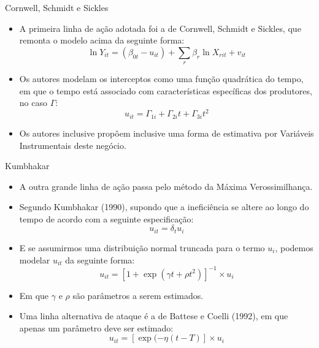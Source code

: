 \documentclass{beamer}
\begin{document}
\begin{frame}{Cornwell, Schmidt e Sickles}

\begin{itemize}
\item A primeira linha de ação adotada foi a de Cornwell, Schmidt e Sickles,
que remonta o modelo acima da seguinte forma:
\[
\ln Y_{it}=(\beta_{0t}-u_{it})+\sum_{r}\beta_{r}\ln X_{rit}+v_{it}
\]
\item Os autores modelam os interceptos como uma função quadrática do tempo,
em que o tempo está associado com características específicas dos
produtores, no caso $\Gamma$:
\[
u_{it}=\Gamma_{1i}+\Gamma_{2i}t+\Gamma_{3i}t^{2}
\]
\item Os autores inclusive propôem inclusive uma forma de estimativa por
Variáveis Instrumentais deste negócio.
\end{itemize}
\end{frame}

\begin{frame}{Kumbhakar}

\begin{itemize}
\item A outra grande linha de ação passa pelo método da Máxima Verossimilhança. 
\item Segundo Kumbhakar (1990), supondo que a ineficiência se altere ao
longo do tempo de acordo com a seguinte especificação:
\[
u_{it}=\delta_{t}u_{i}
\]
\item E se assumirmos uma distribuição normal truncada para o termo $u_{i}$,
podemos modelar $u_{it}$ da seguinte forma:
\[
u_{it}=[1+\exp(\gamma t+\rho t^{2})]^{-1}\times u_{i}
\]
\item Em que $\gamma$ e $\rho$ são parâmetros a serem estimados. 
\item Uma linha alternativa de ataque é a de Battese e Coelli (1992), em
que apenas um parâmetro deve ser estimado:
\[
u_{it}=[\exp(-\eta(t-T)]\times u_{i}
\]
\end{itemize}
\end{frame}
\end{document}
